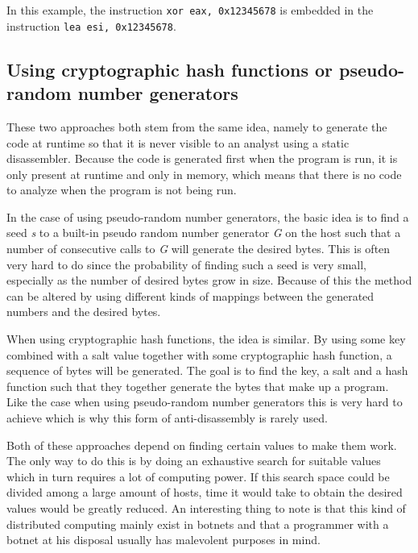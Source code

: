 \documentclass[11pt,twoside]{eitExjobb}
\begin{document}
\noindent In this example, the instruction \texttt{xor eax, 0x12345678} is embedded in the instruction \texttt{lea esi, 0x12345678}.

\subsection{Using cryptographic hash functions or pseudo-random number generators}
These two approaches both stem from the same idea, namely to generate the code at runtime so that it is never visible to an analyst using a static disassembler. Because the code is generated first when the program is run, it is only present at runtime and only in memory, which means that there is no code to analyze when the program is not being run.

In the case of using pseudo-random number generators, the basic idea is to find a seed \emph{s} to a built-in pseudo random number generator \emph{G} on the host such that a number of consecutive calls to \emph{G} will generate the desired bytes. This is often very hard to do since the probability of finding such a seed is very small, especially as the number of desired bytes grow in size. Because of this the method can be altered by using different kinds of mappings between the generated numbers and the desired bytes.\cite{prng}

When using cryptographic hash functions, the idea is similar. By using some key combined with a salt value together with some cryptographic hash function, a sequence of bytes will be generated. The goal is to find the key, a salt and a hash function such that they together generate the bytes that make up a program. Like the case when using pseudo-random number generators this is very hard to achieve which is why this form of anti-disassembly is rarely used.\cite{chf}

Both of these approaches depend on finding certain values to make them work. The only way to do this is by doing an exhaustive search for suitable values which in turn requires a lot of computing power. If this search space could be divided among a large amount of hosts, time it would take to obtain the desired values would be greatly reduced. An interesting thing to note is that this kind of distributed computing mainly exist in botnets and that a programmer with a botnet at his disposal usually has malevolent purposes in mind. 
\end{document}
